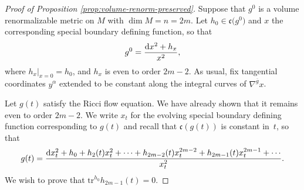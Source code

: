 \documentclass[pdftex]{sigma}
\numberwithin{equation}{section}
\newcommand{\olg}{\overline{g}}
\newcommand{\gin}{{g^0}}
\newcommand{\tr}{\mathrm{tr}}
\begin{document}
\begin{proof}[Proof of Proposition \ref{prop:volume-renorm-preserved}] Suppose that $\gin$ is a volume renormalizable metric on $M$ with $\dim M = n = 2m$. Let $h_0 \in \mathfrak c\big(\gin\big)$ and $x$ the corresponding special boundary defining function, so that
\begin{gather*}%
\gin = \frac{{\rm d}x^2 + h_x}{x^2},
\end{gather*}
where $h_x|_{x=0} = h_0$, and $h_x$ is even to order $2m-2$. As usual, fix tangential coordinates $y^{\alpha}$ extended to be constant along the integral curves of $\nabla^{\olg} x$.

Let $g(t)$ satisfy the Ricci flow equation. We have already shown that it remains even to order $2m-2$. We write $x_t$ for the evolving special boundary defining function corresponding to $g(t)$ and recall that $\mathfrak c(g(t))$ is constant in~$t$, so that
\begin{gather*}%
g(t) = \frac{{\rm d}x_t^2 + h_0 + h_2 (t) x_t^2 + \cdots + h_{2m-2}(t) x_t^{2m-2} + h_{2m-1}(t) x_t^{2m-1} + \cdots}{x_t^2} .
\end{gather*}
We wish to prove that $\tr^{h_0} h_{2m-1}(t) = 0$.


\end{proof}
\end{document}
